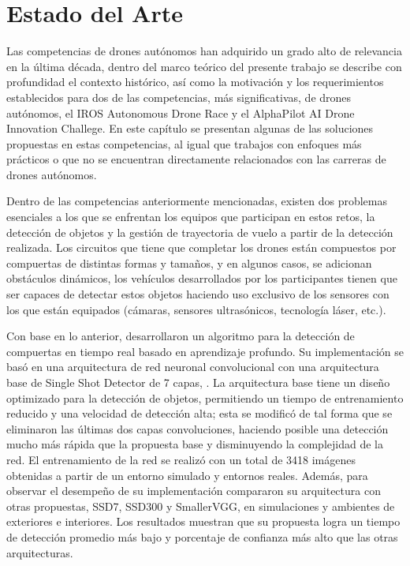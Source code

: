\chapter{Estado del Arte}

Las competencias de drones autónomos han adquirido un grado alto de relevancia en la última década, dentro del marco teórico del presente trabajo se describe con profundidad el contexto histórico, así como la motivación y los requerimientos establecidos para dos de las competencias, más significativas, de drones autónomos, el  IROS Autonomous Drone Race y el AlphaPilot AI Drone Innovation Challege. 
En este capítulo se presentan algunas de las soluciones propuestas en estas competencias, al igual que trabajos con enfoques más prácticos o que no se encuentran directamente relacionados con las carreras de drones autónomos.

Dentro de las competencias anteriormente mencionadas, existen dos problemas esenciales a los que se enfrentan los equipos que participan en estos retos, la detección de objetos y la gestión de trayectoria de vuelo a partir de la detección realizada. 
Los circuitos que tiene que completar los drones están compuestos por compuertas de distintas formas y tamaños, y en algunos casos, se adicionan obstáculos dinámicos, los vehículos desarrollados por los participantes tienen que ser capaces de detectar estos objetos haciendo uso exclusivo de los sensores con los que están equipados (cámaras, sensores ultrasónicos, tecnología láser, etc.).

Con base en lo anterior, \citet{cabrera2019gate} desarrollaron un algoritmo para la detección de compuertas en tiempo real basado en aprendizaje profundo. Su implementación se basó en una arquitectura de red neuronal convolucional con una arquitectura base de Single Shot Detector de 7 capas, \citet{SSD7}. La arquitectura base tiene un diseño optimizado para la detección de objetos, permitiendo un tiempo de entrenamiento reducido y una velocidad de detección alta; esta se modificó de tal forma que se eliminaron las últimas dos capas convoluciones, haciendo posible una detección mucho más rápida que la propuesta base y disminuyendo la complejidad de la red. El entrenamiento de la red se realizó con un total de 3418 imágenes obtenidas a partir de un entorno simulado y entornos reales. 
Además, para observar el desempeño de su implementación compararon su arquitectura con otras propuestas, SSD7, SSD300 y SmallerVGG, en simulaciones y ambientes de exteriores e interiores. Los resultados muestran que su propuesta logra un tiempo de detección promedio más bajo y porcentaje de confianza más alto que las otras arquitecturas. 

